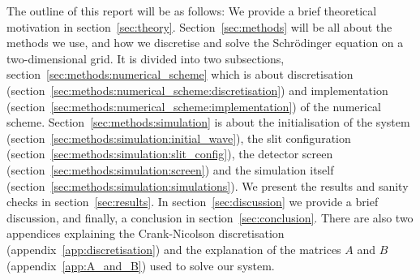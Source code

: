 The outline of this report will be as follows: We provide a brief theoretical motivation in section~\ref{sec:theory}.  Section~\ref{sec:methods} will be all about the methods we use, and how we discretise and solve the Schrödinger equation on a two-dimensional grid. It is divided into two subsections, section~\ref{sec:methods:numerical_scheme} which is about discretisation (section~\ref{sec:methods:numerical_scheme:discretisation}) and implementation (section~\ref{sec:methods:numerical_scheme:implementation}) of the numerical scheme. Section~\ref{sec:methods:simulation} is about the initialisation of the system (section~\ref{sec:methods:simulation:initial_wave}), the slit configuration (section~\ref{sec:methods:simulation:slit_config}), the detector screen (section~\ref{sec:methods:simulation:screen}) and the simulation itself (section~\ref{sec:methods:simulation:simulations}). We present the results and sanity checks in section~\ref{sec:results}. In section~\ref{sec:discussion} we provide a brief discussion, and finally, a conclusion in section~\ref{sec:conclusion}. There are also two appendices explaining the Crank-Nicolson discretisation (appendix~\ref{app:discretisation}) and the explanation of the matrices $A$ and $B$ (appendix~\ref{app:A_and_B}) used to solve our system. 



